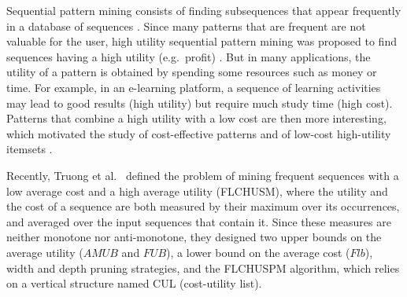 \documentclass[runningheads]{llncs}
\newcommand{\FL}{\textsc{FLCHUSPM}}
\newcommand{\amub}{\ensuremath{\mathit{AMUB}}}
\newcommand{\fub}{\ensuremath{\mathit{FUB}}}
\newcommand{\flb}{\ensuremath{\mathit{Flb}}}
\begin{document}
Sequential pattern mining consists of finding subsequences that appear frequently in a database
of sequences \cite{agrawal1995}. Since many patterns that are frequent are not valuable for the
user, high utility sequential pattern mining was proposed to find sequences having a high
utility (e.g.\ profit) \cite{yin2012uspan,gan2021survey}. But in many applications, the utility of a
pattern is obtained by spending some resources such as money or time. For example, in an
e-learning platform, a sequence of learning activities may lead to good results (high utility)
but require much study time (high cost). Patterns that combine a high utility with a low cost
are then more interesting, which motivated the study of cost-effective patterns
\cite{fournier2020cost} and of low-cost high-utility itemsets \cite{nawaz2022lcim}.

Recently, Truong et al.\ \cite{truong2022} defined the problem of mining frequent sequences
with a low average cost and a high average utility (FLCHUSM), where the utility and the cost of a
sequence are both measured by their maximum over its occurrences, and averaged over the input
sequences that contain it. Since these measures are neither monotone nor anti-monotone, they
designed two upper bounds on the average utility (\amub{} and \fub), a lower bound on the
average cost (\flb), width and depth pruning strategies, and the \FL{} algorithm, which relies
on a vertical structure named CUL (cost-utility list).
\end{document}
